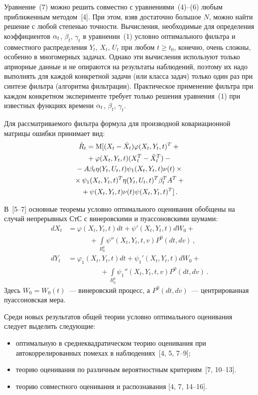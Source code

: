 \begin{multicols}{2}
 Уравнение~(7) можно решить
совместно с уравнениями~(4)--(6) любым приближенным методом~[4]. При этом,
взяв достаточно большое $N$, можно найти решение с любой степенью
точности. Вычисления, необходимые для определения коэффициентов
$\alpha_t$, $\beta_t$, $\gamma_t$ в уравнении~(1) условно
оптимального фильтра и совместного распределения  $Y_t$, $X_t$,
$U_t$ при любом  $t\ge t_0$, конечно, очень сложны, особенно в
многомерных задачах. Однако эти вычисления используют только
априорные данные и не опираются на результаты наблюдений, поэтому
их надо выполнять для каждой конкретной задачи (или класса задач)
только один раз при синтезе фильтра (алгоритма фильтрации).
Практическое применение фильтра при каждом конкретном эксперименте
требует только решения уравнения~(1) при известных функциях
времени $\alpha_t$, $\beta_t$, $\gamma_t$.

Для рассматриваемого фильтра формула для производной
ковариационной матрицы ошибки принимает вид:
\begin{multline*}
\dot R_t = {\rm M}[( X_t -\hat X_t) \varphi ( X_t,Y_t,t)^T +{}\\
{}+\varphi( X_t,Y_t,t) (X_t^T -\hat X_t^T)-{}\\
{}-A\beta_t \eta (Y_t, U_t,t) \psi_1 ( X_t,Y_t,t) \nu(t)\times{}\\
{}\times \psi_1( X_t,Y_t,t)^T \eta (Y_t, U_t,t)^T \beta_t^T A^T+{}\\
{}+\psi ( X_t,Y_t,t) \nu(t) \psi ( X_t,Y_t,t)^T]\,.
\end{multline*}

В~[5--7] основные теоремы условно оптимального оценивания обобщены
на случай непрерывных СтС с винеровскими и пуассоновскими шумами:
\begin{align*}
dX_t &=\varphi(X_t, Y_t, t) dt +\psi'(X_t, Y_t, t)d W_0+{}\\
&\ \ \ \ \ \ \ \ \ \ \ \ \ \ {}+ \int\limits_{R_0^q}
\psi'' (X_t, Y_t, t,v) P^0 (dt, dv)\,,\\
dY_t &=\varphi_1(X_t, Y_t, t) dt +\psi_1'(X_t, Y_t, t)d W_0+{}\\
&\ \ \ \ \ \ \ \ \ \ \ \ \ \ \ \ \ \ \ \ \ {}+ \int\limits_{R_0^q} \psi_1'' (X_t, Y_t, t,v) P^0 (dt, dv)\,.
\end{align*}
Здесь $W_0 = W_0(t)$~--- винеровский процесс, а $P^0 (dt, dv)$~---
центрированная пуассоновская мера.

Среди новых результатов общей теории условно оптимального
оценивания следует выделить следующие:
\begin{itemize}
\item оптимальную в среднеквадратическом теорию оценивания при автокоррелированных
помехах в наблюдениях~[4, 5, 7--9];
\item
 теорию оценивания по различным вероятностным критериям~[7, 10--13].
\item
теорию совместного оценивания и распознавания  [4, 7, 14--16].
\end{itemize}


\end{multicols}
